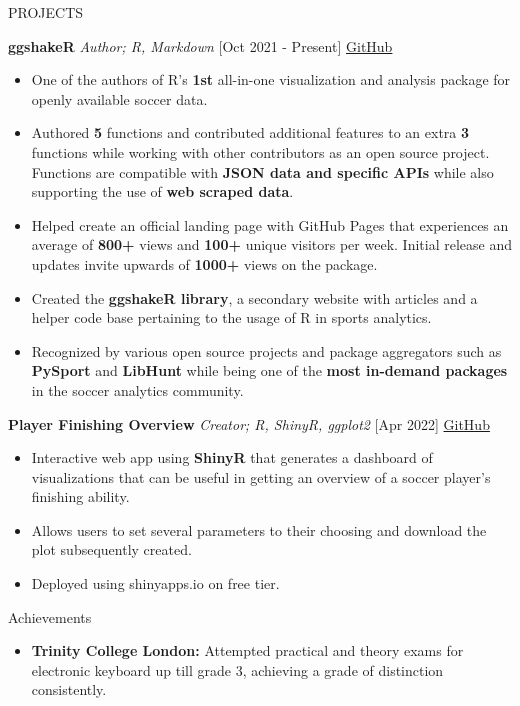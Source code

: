 \documentclass{resume} %
\begin{document}
\begin{rSection}{PROJECTS}

\item \textbf{ggshakeR} {\emph{Author; R, Markdown} [Oct 2021 - Present]} \hfill \href{https://github.com/abhiamishra/ggshakeR}{GitHub}
\begin{itemize}
    \itemsep -3pt {} 
     \item One of the authors of R’s \textbf{1st} all-in-one visualization and analysis package for openly available soccer data.
     \item Authored \textbf{5} functions and contributed additional features to an extra \textbf{3} functions while working with other contributors as an open source project. Functions are compatible with \textbf{JSON data and specific APIs} while also supporting the use of \textbf{web scraped data}.
    \item Helped create an official landing page with GitHub Pages that experiences an average of \textbf{800+} views and \textbf{100+} unique visitors per week. Initial release and updates invite upwards of \textbf{1000+} views on the package.
    \item Created the \textbf{ggshakeR library}, a secondary website with articles and a helper code base pertaining to the usage of R in sports analytics.
    \item Recognized by various open source projects and package aggregators such as \textbf{PySport} and \textbf{LibHunt} while being one of the \textbf{most in-demand packages} in the soccer analytics community.
 \end{itemize}
\item \textbf{Player Finishing Overview} {\emph{Creator; R, ShinyR, ggplot2} [Apr 2022]} \hfill \href{https://github.com/harshkrishna17/PlayerFinishingOverviewShiny}{GitHub}
\begin{itemize}
    \itemsep -3pt {} 
     \item Interactive web app using \textbf{ShinyR} that generates a dashboard of visualizations that can be useful in getting an overview of a soccer player’s finishing ability.
     \item Allows users to set several parameters to their choosing and download the plot subsequently created.
     \item Deployed using shinyapps.io on free tier. 
 \end{itemize}
 
\end{rSection} 


\begin{rSection}{Achievements} 

\begin{itemize}
    \item \textbf{Trinity College London:} Attempted practical and theory exams for electronic keyboard up till grade 3, achieving a grade of distinction consistently.
\end{itemize}

\end{rSection}
\end{document}
